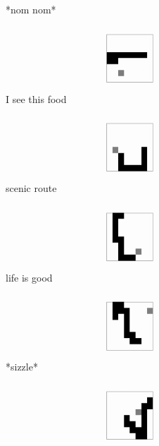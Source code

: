 \documentclass[a4paper]{article}
\begin{document}
\begin{figure}
\begin{subfigure}[b]{0.24\textwidth}
        \caption{*nom nom*}
    \end{subfigure}
    \begin{subfigure}[b]{0.24\textwidth}
        \includegraphics[width=\textwidth]{qsnake_snaps/6}
        \caption{I see this food}
    \end{subfigure}
    \begin{subfigure}[b]{0.24\textwidth}
        \includegraphics[width=\textwidth]{qsnake_snaps/7}
        \caption{scenic route}
    \end{subfigure}
    \begin{subfigure}[b]{0.24\textwidth}
        \includegraphics[width=\textwidth]{qsnake_snaps/8}
        \caption{life is good}
    \end{subfigure}
    \begin{subfigure}[b]{0.24\textwidth}
        \includegraphics[width=\textwidth]{qsnake_snaps/9}
        \caption{*sizzle*}
    \end{subfigure}
    \begin{subfigure}[b]{0.24\textwidth}
        \includegraphics[width=\textwidth]{qsnake_snaps/10}

\end{subfigure}
\end{figure}
\end{document}

